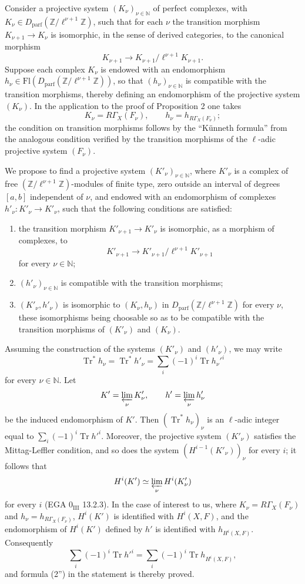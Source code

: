 \documentclass[11pt]{article}
\providecommand{\Tr}{\operatorname{Tr}}
\providecommand{\Tr}{\operatorname{Tr}}
\providecommand{\Tr}{\operatorname{Tr}}
\providecommand{\Tr}{\operatorname{Tr}}
\providecommand{\Tr}{\operatorname{Tr}}
\begin{document}
Consider a projective system $(K_\nu)_{\nu\in\mathbb N}$ of perfect complexes, with $K_\nu\in D_{\mathrm{parf}}(\mathbb Z/\ell^{\nu+1}\mathbb Z)$, such that for each $\nu$ the transition morphism $K_{\nu+1}\to K_\nu$ is isomorphic, in the sense of derived categories, to the canonical morphism
\[
K_{\nu+1}\to K_{\nu+1}/\ell^{\nu+1}K_{\nu+1}.
\]
Suppose each complex $K_\nu$ is endowed with an endomorphism $h_\nu\in\mathrm{Fl}(D_{\mathrm{parf}}(\mathbb Z/\ell^{\nu+1}\mathbb Z))$, so that $(h_\nu)_{\nu\in\mathbb N}$ is compatible with the transition morphisms, thereby defining an endomorphism of the projective system $(K_\nu)$. In the application to the proof of Proposition 2 one takes
\[
K_\nu=R\Gamma_X(F_\nu),\qquad h_\nu=h_{R\Gamma_X(F_\nu)};
\]
the condition on transition morphisms follows by the ``Künneth formula'' from the analogous condition verified by the transition morphisms of the $\ell$-adic projective system $(F_\nu)$.

We propose to find a projective system $(K'_\nu)_{\nu\in\mathbb N}$, where $K'_\nu$ is a complex of free $(\mathbb Z/\ell^{\nu+1}\mathbb Z)$-modules of finite type, zero outside an interval of degrees $[a,b]$ independent of $\nu$, and endowed with an endomorphism of complexes $h'_\nu:K'_\nu\to K'_\nu$, such that the following conditions are satisfied:
\begin{enumerate}[label=\arabic*)]
\item the transition morphism $K'_{\nu+1}\to K'_\nu$ is isomorphic, as a morphism of complexes, to
\[
K'_{\nu+1}\to K'_{\nu+1}/\ell^{\nu+1}K'_{\nu+1}
\]
for every $\nu\in\mathbb N$;
\item $(h'_\nu)_{\nu\in\mathbb N}$ is compatible with the transition morphisms;
\item $(K'_\nu,h'_\nu)$ is isomorphic to $(K_\nu,h_\nu)$ in $D_{\mathrm{parf}}(\mathbb Z/\ell^{\nu+1}\mathbb Z)$ for every $\nu$, these isomorphisms being choosable so as to be compatible with the transition morphisms of $(K'_\nu)$ and $(K_\nu)$.
\end{enumerate}
Assuming the construction of the systems $(K'_\nu)$ and $(h'_\nu)$, we may write
\[
\Tr^*h_\nu=\Tr^*h'_\nu=\sum_i(-1)^i\Tr h_\nu'^i
\]
for every $\nu\in\mathbb N$. Let
\[
K'=\varprojlim_\nu K'_\nu,
\qquad h'=\varprojlim_\nu h'_\nu
\]
be the induced endomorphism of $K'$. Then $(\Tr^*h_\nu)_\nu$ is an $\ell$-adic integer equal to $\sum_i(-1)^i\Tr h'^i$. Moreover, the projective system $(K'_\nu)$ satisfies the Mittag-Leffler condition, and so does the system $(H^{i-1}(K'_\nu))_\nu$ for every $i$; it follows that
\[
H^i(K')\simeq\varprojlim_\nu H^i(K'_\nu)
\]
for every $i$ (EGA $0_{\mathrm{III}}$ 13.2.3). In the case of interest to us, where $K_\nu=R\Gamma_X(F_\nu)$ and $h_\nu=h_{R\Gamma_X(F_\nu)}$, $H^i(K')$ is identified with $H^i(X,F)$, and the endomorphism of $H^i(K')$ defined by $h'$ is identified with $h_{H^i(X,F)}$. Consequently
\[
\sum_i(-1)^i\Tr h'^i=
\sum_i(-1)^i\Tr h_{H^i(X,F)},
\]
and formula (2'') in the statement is thereby proved.
\end{document}
